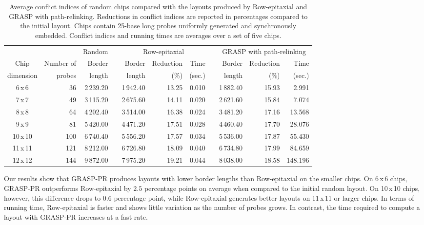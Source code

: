 \documentclass[english]{lni}
\begin{document}
\begin{table}[t]
\caption{Average conflict indices of random chips compared with the layouts produced by
Row-epitaxial and GRASP with path-relinking. Reductions in conflict indices are
reported in percentages compared to the initial layout. Chips contain 25-base
long probes uniformly generated and synchronously embedded. Conflict indices and
running times are averages over a set of five chips.\label{tab:graspr_reptx_ci}}
\vspace*{2ex}
\scriptsize{
\begin{tabular}{crrcrrrcrrr}
          &            & Random & & \multicolumn{3}{c}{Row-epitaxial}  & & \multicolumn{3}{c}{GRASP with path-relinking}  \\ \cline{3-3} \cline{5-7} \cline{9-11}
Chip      & Number of  & Border & & Border & Reduction & Time          & & Border & Reduction & Time   \\
dimension & probes     & length & & length & (\%)      & (sec.)        & & length & (\%)      & (sec.) \\
\hline
6\,x\,6   &  36 & 2\,239.20 & & 1\,942.40 & 13.25 & 0.010 & & 1\,882.40 & 15.93 & 2.991   \\
7\,x\,7   &  49 & 3\,115.20 & & 2\,675.60 & 14.11 & 0.020 & & 2\,621.60 & 15.84 & 7.074   \\
8\,x\,8   &  64 & 4\,202.40 & & 3\,514.00 & 16.38 & 0.024 & & 3\,481.20 & 17.16 & 13.568  \\
9\,x\,9   &  81 & 5\,420.00 & & 4\,471.20 & 17.51 & 0.028 & & 4\,460.40 & 17.70 & 28.076  \\
10\,x\,10 & 100 & 6\,740.40 & & 5\,556.20 & 17.57 & 0.034 & & 5\,536.00 & 17.87 & 55.430  \\
11\,x\,11 & 121 & 8\,212.00 & & 6\,726.80 & 18.09 & 0.040 & & 6\,734.80 & 17.99 & 84.659  \\
12\,x\,12 & 144 & 9\,872.00 & & 7\,975.20 & 19.21 & 0.044 & & 8\,038.00 & 18.58 & 148.196 \\
\hline
\end{tabular}}
\end{table}

Our results show that GRASP-PR produces layouts with lower border lengths than
Row-epitaxial on the smaller chips. On 6\,x\,6 chips, GRASP-PR
outperforms Row-epitaxial by $2.5$ percentage points on average when compared to
the initial random layout. On 10\,x\,10 chips, however, this difference drops to
$0.6$ percentage point, while Row-epitaxial generates better layouts on 11\,x\,11
or larger chips.
In terms of running time, Row-epitaxial is faster and shows little variation
as the number of probes grows. In contrast, the time required to compute a
layout with GRASP-PR increases at a fast rate.
\end{document}
